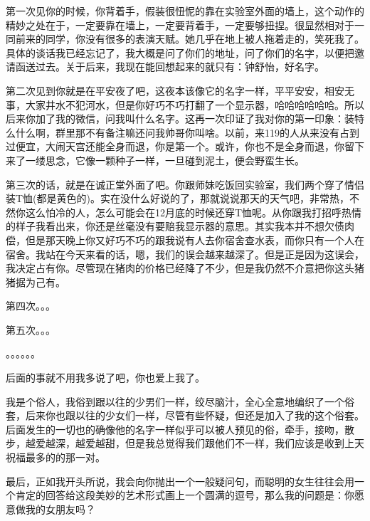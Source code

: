 \documentclass[cn,11pt,chinese]{elegantbook}
\begin{document}
第一次见你的时候，你背着手，假装很忸怩的靠在实验室外面的墙上，这个动作的精妙之处在于，一定要靠在墙上，一定要背着手，一定要够扭捏。很显然相对于一同前来的同学，你没有很多的表演天赋。她几乎在地上被人拖着走的，笑死我了。具体的谈话我已经忘记了，我大概是问了你们的地址，问了你们的名字，以便把邀请函送过去。关于后来，我现在能回想起来的就只有：钟舒怡，好名字。

第二次见到你就是在平安夜了吧，这夜本该像它的名字一样，平平安安，相安无事，大家井水不犯河水，但是你好巧不巧打翻了一个显示器，哈哈哈哈哈哈。所以后来你加了我的微信，问我叫什么名字。这再一次印证了我对你的第一印象：装特么什么啊，群里那不有备注嘛还问我帅哥你叫啥。以前，来119的人从来没有占到过便宜，大闹天宫还能全身而退，你是第一个。或许，你也不是全身而退，你留下来了一缕思念，它像一颗种子一样，一旦碰到泥土，便会野蛮生长。

第三次的话，就是在诚正堂外面了吧。你跟师妹吃饭回实验室，我们两个穿了情侣装T恤(都是黄色的)。实在没什么好说的了，那就说说那天的天气吧，非常热，不然你这么怕冷的人，怎么可能会在12月底的时候还穿T恤呢。从你跟我打招呼热情的样子我看出来，你还是丝毫没有要赔我显示器的意思。其实我本并不想欠债肉偿，但是那天晚上你又好巧不巧的跟我说有人去你宿舍查水表，而你只有一个人在宿舍。我站在今天来看的话，嗯，我们的误会越来越深了。但是正是因为这误会，我决定占有你。尽管现在猪肉的价格已经降了不少，但是我仍然不介意把你这头猪猪据为己有。

第四次。。。

第五次。。。

。。。。。。

后面的事就不用我多说了吧，你也爱上我了。

我是个俗人，我俗到跟以往的少男们一样，绞尽脑汁，全心全意地编织了一个俗套，后来你也跟以往的少女们一样，尽管有些怀疑，但还是加入了我的这个俗套。后面发生的一切也的确像他的名字一样似乎可以被人预见的俗，牵手，接吻，散步，越爱越深，越爱越甜，但是我总觉得我们跟他们不一样，我们应该是收到上天祝福最多的的那一对。

最后，正如我开头所说，我会向你抛出一个一般疑问句，而聪明的女生往往会用一个肯定的回答给这段美妙的艺术形式画上一个圆满的逗号，那么我的问题是：你愿意做我的女朋友吗？
\end{document}
